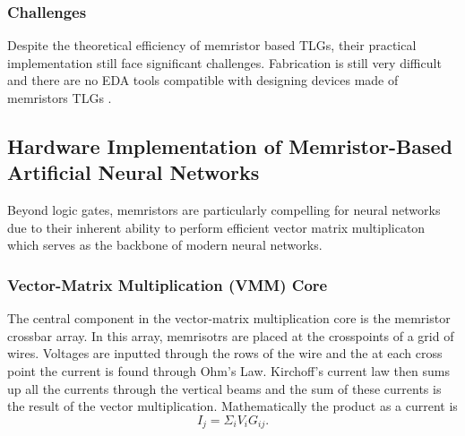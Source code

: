 \documentclass[sigconf]{acmart}
\begin{document}
\subsubsection{Challenges}
Despite the theoretical efficiency of memristor based TLGs, 
their practical implementation still face significant challenges. 
Fabrication is still very difficult and there are no EDA tools 
compatible with designing devices made of memristors TLGs \cite{papandroulidakis2019practical}. 

\subsection{Hardware Implementation of Memristor-Based Artificial Neural Networks}
Beyond logic gates, memristors are particularly compelling for 
neural networks due to their inherent ability to perform efficient 
vector matrix multiplicaton which serves as the backbone of 
modern neural networks. 

\subsubsection{Vector-Matrix Multiplication (VMM) Core}
The central component in the vector-matrix multiplication core 
is the memristor crossbar array. In this array, memrisotrs are placed
at the crosspoints of a grid of wires. Voltages are inputted through
the rows of the wire and the at each cross point the current is 
found through Ohm's Law. Kirchoff's current law then sums up all the 
currents through the vertical beams and the sum of these currents 
is the result of the vector multiplication. Mathematically the
product as a current is 
\[I_j = \Sigma_iV_iG_{ij}.\]
\end{document}
